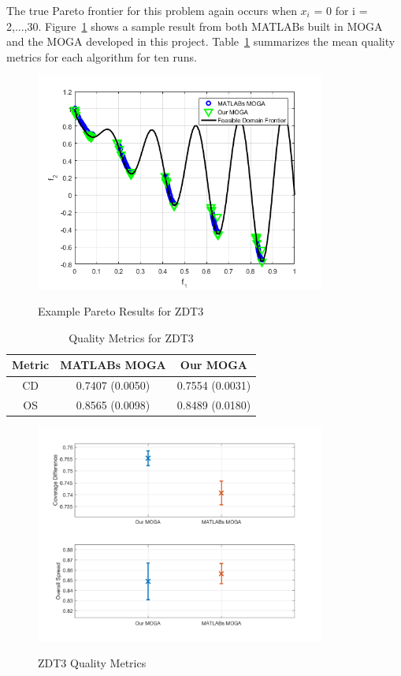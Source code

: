 \documentclass{article}
\begin{document}
\noindent The true Pareto frontier for this problem again occurs when $x_i$ = 0 for i = 2,...,30. Figure~\ref{fig:ZDT3} shows a sample result from both MATLABs built in MOGA and the MOGA developed in this project. Table~\ref{tab:ZDT3} summarizes the mean quality metrics for each algorithm for ten runs. \newline

\begin{figure}[H]
  \caption{Example Pareto Results for ZDT3}
  \centering
  \includegraphics[width=0.85\textwidth]{ZDT3_pareto_final.png}  
  \label{fig:ZDT3}
\end{figure}

\begin{table}[H]
\caption{Quality Metrics for ZDT3} 
\centering 
\begin{tabular}{|c|c|c|} 
\hline\hline  
Metric & MATLABs MOGA & Our MOGA \\ \hline
CD & 0.7407 (0.0050) & 0.7554 (0.0031) \\ \hline
OS & 0.8565 (0.0098) & 0.8489 (0.0180) \\ \hline
\end{tabular}
\label{tab:ZDT3} 
\end{table}
\begin{figure}[h]
  \caption{ZDT3 Quality Metrics}
  \centering
  \includegraphics[width=0.85\textwidth]{ZDT3_QM.png}  
  \label{fig:ZDT3_QM}
\end{figure}
\end{document}
